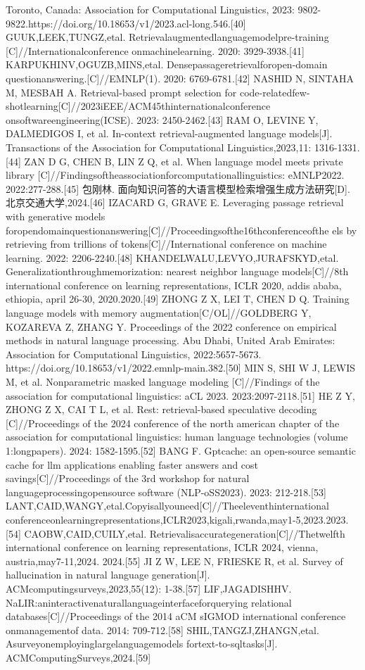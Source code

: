 \documentclass[12pt,a4paper,openright,UTF8]{ctexbook}
\begin{document}
Toronto, Canada: Association for Computational Linguistics, 2023: 9802-9822.https://doi.org/10.18653/v1/2023.acl-long.546.[40] GUUK,LEEK,TUNGZ,etal. Retrievalaugmentedlanguagemodelpre-training [C]//Internationalconference onmachinelearning. 2020: 3929-3938.[41] KARPUKHINV,OGUZB,MINS,etal. Densepassageretrievalforopen-domain questionanswering.[C]//EMNLP(1). 2020: 6769-6781.[42] NASHID N, SINTAHA M, MESBAH A. Retrieval-based prompt selection for code-relatedfew-shotlearning[C]//2023iEEE/ACM45thinternationalconference onsoftwareengineering(ICSE). 2023: 2450-2462.[43] RAM O, LEVINE Y, DALMEDIGOS I, et al. In-context retrieval-augmented language models[J]. Transactions of the Association for Computational Linguistics,2023,11: 1316-1331.[44] ZAN D G, CHEN B, LIN Z Q, et al. When language model meets private library [C]//Findingsoftheassociationforcomputationallinguistics: eMNLP2022. 2022:277-288.[45] 包刚林. 面向知识问答的大语言模型检索增强生成方法研究[D]. 北京交通大学,2024.[46] IZACARD G, GRAVE E. Leveraging passage retrieval with generative models foropendomainquestionanswering[C]//Proceedingsofthe16thconferenceofthe els by retrieving from trillions of tokens[C]//International conference on machine learning. 2022: 2206-2240.[48] KHANDELWALU,LEVYO,JURAFSKYD,etal. Generalizationthroughmemorization: nearest neighbor language models[C]//8th international conference on learning representations, ICLR 2020, addis ababa, ethiopia, april 26-30, 2020.2020.[49] ZHONG Z X, LEI T, CHEN D Q. Training language models with memory augmentation[C/OL]//GOLDBERG Y, KOZAREVA Z, ZHANG Y. Proceedings of the 2022 conference on empirical methods in natural language processing. Abu Dhabi, United Arab Emirates: Association for Computational Linguistics, 2022:5657-5673. https://doi.org/10.18653/v1/2022.emnlp-main.382.[50] MIN S, SHI W J, LEWIS M, et al. Nonparametric masked language modeling [C]//Findings of the association for computational linguistics: aCL 2023. 2023:2097-2118.[51] HE Z Y, ZHONG Z X, CAI T L, et al. Rest: retrieval-based speculative decoding [C]//Proceedings of the 2024 conference of the north american chapter of the association for computational linguistics: human language technologies (volume 1:longpapers). 2024: 1582-1595.[52] BANG F. Gptcache: an open-source semantic cache for llm applications enabling faster answers and cost savings[C]//Proceedings of the 3rd workshop for natural languageprocessingopensource software (NLP-oSS2023). 2023: 212-218.[53] LANT,CAID,WANGY,etal.Copyisallyouneed[C]//Theeleventhinternational conferenceonlearningrepresentations,ICLR2023,kigali,rwanda,may1-5,2023.2023.[54] CAOBW,CAID,CUILY,etal. Retrievalisaccurategeneration[C]//Thetwelfth international conference on learning representations, ICLR 2024, vienna, austria,may7-11,2024. 2024.[55] JI Z W, LEE N, FRIESKE R, et al. Survey of hallucination in natural language generation[J]. ACMcomputingsurveys,2023,55(12): 1-38.[57] LIF,JAGADISHHV. NaLIR:aninteractivenaturallanguageinterfaceforquerying relational databases[C]//Proceedings of the 2014 aCM sIGMOD international conference onmanagementof data. 2014: 709-712.[58] SHIL,TANGZJ,ZHANGN,etal. Asurveyonemployinglargelanguagemodels fortext-to-sqltasks[J]. ACMComputingSurveys,2024.[59] 
\end{document}

